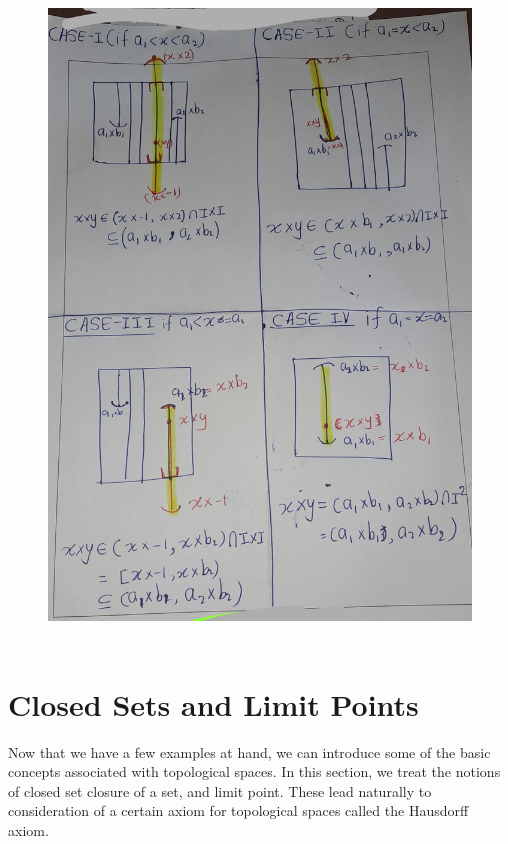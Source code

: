 \documentclass[
]{book}
\theoremstyle{definition}
\theoremstyle{definition}
\theoremstyle{definition}
\theoremstyle{definition}
\theoremstyle{remark}
\begin{document}
\begin{figure}
\centering
\includegraphics{figures/figure 15.jpg}
\caption{\label{fig:fig15}\(~\)}
\end{figure}

\hypertarget{closed-sets-and-limit-points}{%
\section{Closed Sets and Limit Points}\label{closed-sets-and-limit-points}}

Now that we have a few examples at hand, we can introduce some of the basic concepts associated with topological spaces. In this section, we treat the notions of closed set closure of a set, and limit point. These lead naturally to consideration of a certain axiom for topological spaces called the Hausdorff axiom.
\end{document}
